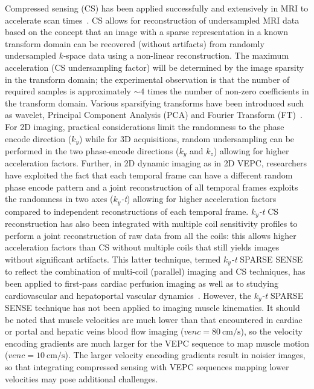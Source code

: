 Compressed sensing (CS) has been applied successfully and extensively in MRI to accelerate scan times~\cite{Lustig:2007cua}. 
CS allows for reconstruction of undersampled MRI data based on the concept that an image with a sparse representation in a known transform domain can be recovered (without artifacts) from randomly undersampled \mbox{\textit{k-}space} data using a non-linear reconstruction. 
The maximum acceleration (CS undersampling factor) will be determined by the image sparsity in the transform domain; the experimental observation is that the number of required samples is approximately $\sim 4$ times the number of non-zero coefficients in the transform domain. 
Various sparsifying transforms have been introduced such as wavelet, Principal Component Analysis (PCA) and Fourier Transform (FT)~\cite{Lustig:2007cua}. 
For 2D imaging, practical considerations limit the randomness to the phase encode direction ($k_y$) while for 3D acquisitions, random undersampling can be performed in the two phase-encode directions ($k_y$ and $k_z$) allowing for higher acceleration factors. 
Further, in 2D dynamic imaging as in 2D VEPC, researchers have exploited the fact that each temporal frame can have a different random phase encode pattern and a joint reconstruction of all temporal frames exploits the randomness in two axes ($k_y$\textit{-t}) allowing for higher acceleration factors compared to independent reconstructions of each temporal frame. 
$k_y$\textit{-t} CS reconstruction has also been integrated with multiple coil sensitivity profiles to perform a joint reconstruction of raw data from all the coils: this allows higher acceleration factors than CS without multiple coils that still yields images without significant artifacts. 
This latter technique, termed $k_y$\textit{-t} SPARSE SENSE to reflect the combination of multi-coil (parallel) imaging and CS techniques, has been applied to first-pass cardiac perfusion imaging as well as to studying cardiovascular and hepatoportal vascular dynamics~\cite{RNCS9, RNCS10}. 
However, the $k_y$\textit{-t} SPARSE SENSE technique has not been applied to imaging muscle kinematics. 
It should be noted that muscle velocities are much lower than that encountered in cardiac or portal and hepatic veins blood flow imaging ($venc = \SI{80}{\centi\meter/\second}$), so the velocity encoding gradients are much larger for the VEPC sequence to map muscle motion ($venc = \SI{10}{\centi\meter/\second}$). 
The larger velocity encoding gradients result in noisier images, so that integrating compressed sensing with VEPC sequences mapping lower velocities may pose additional challenges. 

